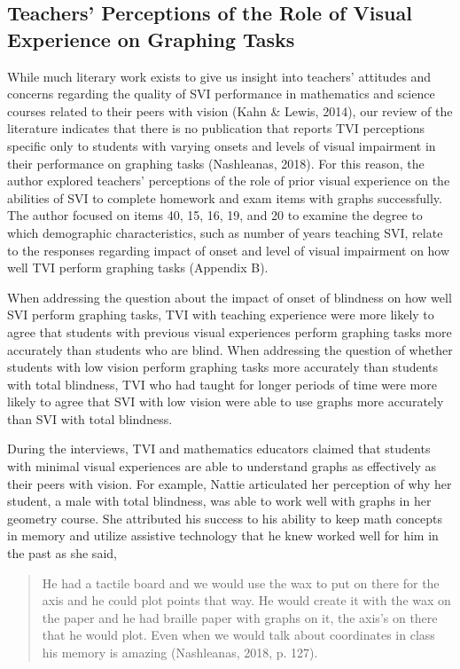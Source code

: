 \documentclass[11.5pt]{sig-alternate} %
\begin{document}
\begin{large}
\subsection*{Teachers’ Perceptions of the Role of Visual Experience on Graphing Tasks}

While much literary work exists to give us insight into teachers’ attitudes and concerns regarding the quality of SVI performance in mathematics and science courses related to their peers with vision (Kahn \& Lewis, 2014), our review of the literature indicates that there is no publication that reports TVI perceptions specific only to students with varying onsets and levels of visual impairment in their performance on graphing tasks (Nashleanas, 2018). For this reason, the author explored teachers’ perceptions of the role of prior visual experience on the abilities of SVI to complete homework and exam items with graphs successfully. The author focused on items 40, 15, 16, 19, and 20 to examine the degree to which demographic characteristics, such as number of years teaching SVI, relate to the responses regarding impact of onset and level of visual impairment on how well TVI perform graphing tasks (Appendix B). 

When addressing the question about the impact of onset of blindness on how well SVI perform graphing tasks, TVI with teaching experience were more likely to agree that students with previous visual experiences perform graphing tasks more accurately than students who are blind. When addressing the question of whether students with low vision perform graphing tasks more accurately than students with total blindness, TVI who had taught for longer periods of time were more likely to agree that SVI with low vision were able to use graphs more accurately than SVI with total blindness.
 
During the interviews, TVI and mathematics educators claimed that students with minimal visual experiences are able to understand graphs as effectively as their peers with vision. For example, Nattie articulated her perception of why her student, a male with total blindness, was able to work well with graphs in her geometry course. She attributed his success to his ability to keep math concepts in memory and utilize assistive technology that he knew worked well for him in the past as she said,  

\begin{quote}

He had a tactile board and we would use the wax to put on there for the axis and he could plot points that way. He would create it with the wax on the paper and he had braille paper with graphs on it, the axis's on there that he would plot. Even when we would talk about coordinates in class his memory is amazing (Nashleanas, 2018, p. 127).


\end{quote}
\end{large}
\end{document}

